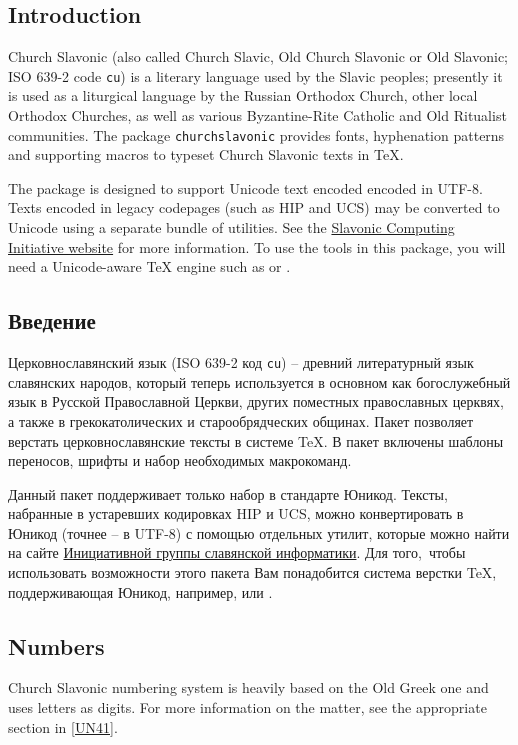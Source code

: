 \begin{EN}
\section{Introduction}
Church Slavonic (also called Church Slavic, Old Church Slavonic
or Old Slavonic; ISO 639-2 code \texttt{cu}) is a literary language used by
the Slavic peoples; presently it is used as a liturgical language by the
Russian Orthodox Church, other local Orthodox Churches, as well
as various Byzantine-Rite Catholic and Old Ritualist communities.
The package \texttt{churchslavonic} provides fonts, hyphenation
patterns and supporting macros to typeset
Church Slavonic texts in \TeX{}.

The package is designed to support Unicode text encoded encoded in UTF-8.
Texts encoded in legacy codepages (such as HIP and UCS) may be
converted to Unicode using a separate bundle of utilities.
See the \href{http://sci.ponomar.net/}
{Slavonic Computing Initiative website} for more information.
To use the tools in this package, you will need a Unicode-aware \TeX{}
engine such as \XeTeX{} or \LuaTeX{}.
\end{EN}

\begin{RU}
\section{Введение}
Церковнославянский язык (ISO 639-2 код \texttt{cu}) --
древний литературный язык славянских народов,
который теперь используется в основном как богослужебный язык
в Русской Православной Церкви, других поместных православных
церквях, а также в грекокатолических и старообрядческих общинах.
Пакет  позволяет верстать церковнославянские тексты
в системе \TeX{}. В пакет включены шаблоны переносов,
шрифты и набор необходимых макрокоманд.

Данный пакет поддерживает только набор в стандарте Юникод.
Тексты, набранные в устаревших кодировках HIP и UCS,
можно конвертировать в Юникод (точнее -- в UTF-8) с помощью
отдельных утилит, которые можно найти на сайте
\href{http://sci.ponomar.net/}
{Инициативной группы славянской информатики}.
Для того, чтобы использовать возможности этого пакета Вам
понадобится система верстки \TeX{}, поддерживающая Юникод,
например, \XeTeX{} или \LuaTeX{}.
\end{RU}

\begin{EN}
\section{Numbers}

Church Slavonic numbering system is heavily based on the Old Greek one and uses 
letters as digits.
For more information on the matter, see the appropriate section in \ref{UN41}.
\end{EN}

